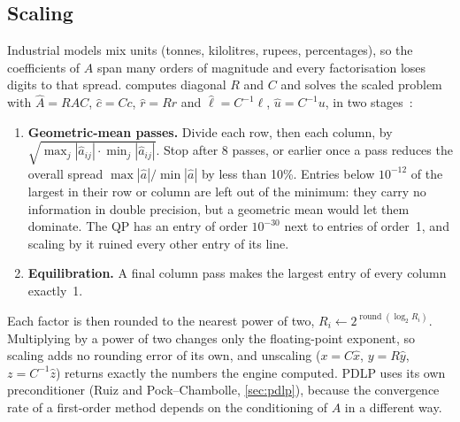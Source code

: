 \subsection{Scaling}\label{sec:scaling}
Industrial models mix units (tonnes, kilolitres, rupees, percentages), so the coefficients of
$A$ span many orders of magnitude and every factorisation loses digits to that spread.
 computes diagonal $R$ and $C$ and solves the scaled problem with
$\hat A=RAC$, $\hat c=Cc$, $\hat r = R r$ and $\hat\ell = C^{-1}\ell$, $\hat u = C^{-1}u$, in two
stages~\cite{elble2012}:
\begin{enumerate}
  \item \textbf{Geometric-mean passes.} Divide each row, then each column, by
        $\sqrt{\max_j|\hat a_{ij}|\cdot\min_j|\hat a_{ij}|}$. Stop after 8 passes, or earlier once
        a pass reduces the overall spread $\max|\hat a|/\min|\hat a|$ by less than 10\%. Entries
        below $10^{-12}$ of the largest in their row or column are left out of the minimum: they
        carry no information in double precision, but a geometric mean would let them dominate.
        The QP  has an entry of order $10^{-30}$ next to entries of order~1, and scaling by
        it ruined every other entry of its line.
  \item \textbf{Equilibration.} A final column pass makes the largest entry of every column
        exactly~1.
\end{enumerate}
Each factor is then rounded to the nearest power of two, $R_i \leftarrow 2^{\operatorname{round}(\log_2 R_i)}$.
Multiplying by a power of two changes only the floating-point exponent, so scaling adds no rounding
error of its own, and unscaling ($x=C\hat x$, $y=R\hat y$, $z=C^{-1}\hat z$) returns exactly the
numbers the engine computed. PDLP uses its own preconditioner (Ruiz and Pock--Chambolle,
\cref{sec:pdlp}), because the convergence rate of a first-order method depends on the conditioning
of $A$ in a different way.
